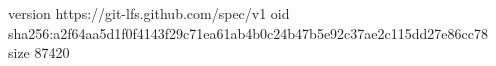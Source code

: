 version https://git-lfs.github.com/spec/v1
oid sha256:a2f64aa5d1f0f4143f29c71ea61ab4b0c24b47b5e92c37ae2c115dd27e86cc78
size 87420
